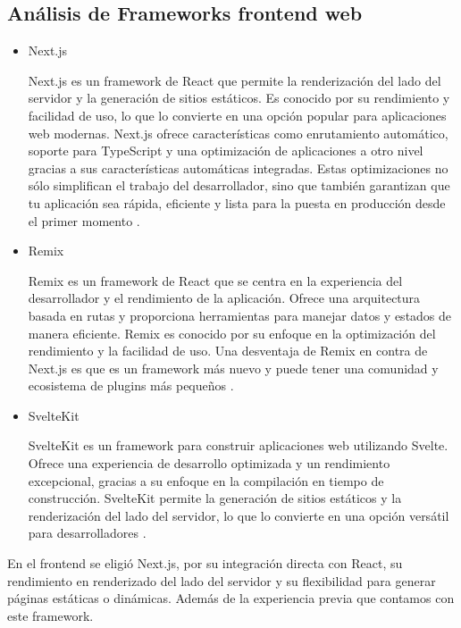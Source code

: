 \subsection{Análisis de Frameworks frontend web}

\begin{itemize}
    \item Next.js

    Next.js es un framework de React que permite la renderización del lado del servidor y la generación de sitios estáticos. Es conocido por su rendimiento y facilidad de uso, 
    lo que lo convierte en una opción popular para aplicaciones web modernas. Next.js ofrece características como enrutamiento automático, soporte para TypeScript y 
    una optimización de aplicaciones a otro nivel gracias a sus características automáticas integradas. Estas optimizaciones no sólo simplifican el trabajo del desarrollador, 
    sino que también garantizan que tu aplicación sea rápida, eficiente y lista para la puesta en producción desde el primer momento \cite{NextJSOfficial}.

    \item Remix
    
    Remix es un framework de React que se centra en la experiencia del desarrollador y el rendimiento de la aplicación. Ofrece una arquitectura basada en rutas y
    proporciona herramientas para manejar datos y estados de manera eficiente. Remix es conocido por su enfoque en la optimización del rendimiento y la facilidad de uso. 
    Una desventaja de Remix en contra de Next.js es que es un framework más nuevo y puede tener una comunidad y ecosistema de plugins más pequeños \cite{Remix}.

    \item SvelteKit

    SvelteKit es un framework para construir aplicaciones web utilizando Svelte. Ofrece una experiencia de desarrollo optimizada y un rendimiento excepcional, 
    gracias a su enfoque en la compilación en tiempo de construcción. SvelteKit permite la generación de sitios estáticos y la renderización del lado del servidor, 
    lo que lo convierte en una opción versátil para desarrolladores \cite{SvelteKit}.


\end{itemize}

En el frontend se eligió Next.js, por su integración directa con React, su rendimiento en renderizado del lado del servidor y su flexibilidad para generar 
páginas estáticas o dinámicas. Además de la experiencia previa que contamos con este framework.


